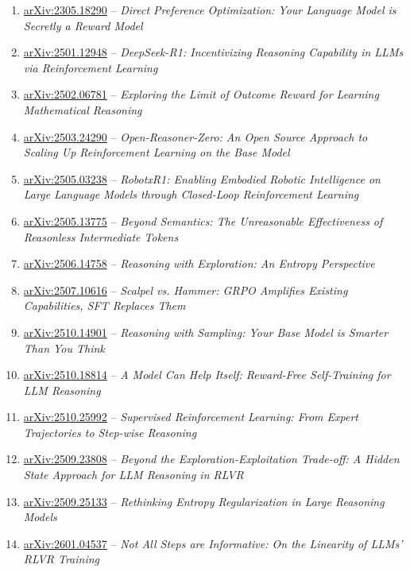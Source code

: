 \documentclass[11pt]{article}
\begin{document}
\begin{enumerate}
\item \href{https://arxiv.org/abs/2305.18290}{arXiv:2305.18290} -- \emph{Direct Preference Optimization: Your Language Model is Secretly a Reward Model}
\item \href{https://arxiv.org/abs/2501.12948}{arXiv:2501.12948} -- \emph{DeepSeek-R1: Incentivizing Reasoning Capability in LLMs via Reinforcement Learning}
\item \href{https://arxiv.org/abs/2502.06781}{arXiv:2502.06781} -- \emph{Exploring the Limit of Outcome Reward for Learning Mathematical Reasoning}
\item \href{https://arxiv.org/abs/2503.24290}{arXiv:2503.24290} -- \emph{Open-Reasoner-Zero: An Open Source Approach to Scaling Up Reinforcement Learning on the Base Model}
\item \href{https://arxiv.org/abs/2505.03238}{arXiv:2505.03238} -- \emph{RobotxR1: Enabling Embodied Robotic Intelligence on Large Language Models through Closed-Loop Reinforcement Learning}
\item \href{https://arxiv.org/abs/2505.13775}{arXiv:2505.13775} -- \emph{Beyond Semantics: The Unreasonable Effectiveness of Reasonless Intermediate Tokens}
\item \href{https://arxiv.org/abs/2506.14758}{arXiv:2506.14758} -- \emph{Reasoning with Exploration: An Entropy Perspective}
\item \href{https://arxiv.org/abs/2507.10616}{arXiv:2507.10616} -- \emph{Scalpel vs. Hammer: GRPO Amplifies Existing Capabilities, SFT Replaces Them}
\item \href{https://arxiv.org/abs/2510.14901}{arXiv:2510.14901} -- \emph{Reasoning with Sampling: Your Base Model is Smarter Than You Think}
\item \href{https://arxiv.org/abs/2510.18814}{arXiv:2510.18814} -- \emph{A Model Can Help Itself: Reward-Free Self-Training for LLM Reasoning}
\item \href{https://arxiv.org/abs/2510.25992}{arXiv:2510.25992} -- \emph{Supervised Reinforcement Learning: From Expert Trajectories to Step-wise Reasoning}
\item \href{https://arxiv.org/abs/2509.23808}{arXiv:2509.23808} -- \emph{Beyond the Exploration-Exploitation Trade-off: A Hidden State Approach for LLM Reasoning in RLVR}
\item \href{https://arxiv.org/abs/2509.25133}{arXiv:2509.25133} -- \emph{Rethinking Entropy Regularization in Large Reasoning Models}
\item \href{https://arxiv.org/abs/2601.04537}{arXiv:2601.04537} -- \emph{Not All Steps are Informative: On the Linearity of LLMs' RLVR Training}

\end{enumerate}
\end{document}
